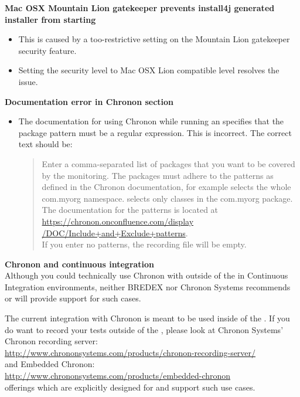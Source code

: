 \textbf{Mac OSX Mountain Lion gatekeeper prevents install4j generated installer from starting}
\begin{itemize}
\item This is caused by a too-restrictive setting on the Mountain Lion gatekeeper security feature.
\item Setting the security level to Mac OSX Lion compatible level resolves the issue.
\end{itemize}


\textbf{Documentation error in Chronon section}
\begin{itemize}
\item The documentation for using Chronon while running an \gdaut{} specifies that the package pattern must be a regular expression. This is incorrect. The correct text should be: 
\begin{quote}Enter a comma-separated list of packages that you want to be covered by the monitoring. The packages must adhere to the patterns as defined in the Chronon documentation, for example  selects the whole com.myorg namespace.  selects only classes in the com.myorg package. The documentation for the patterns is located at \\
\href{https://chronon.onconfluence.com/display/DOC/Include+and+Exclude+patterns}{https://chronon.onconfluence.com/display\\
/DOC/Include+and+Exclude+patterns}.\\
 If you enter no patterns, the recording file will be empty.
\end{quote}
\end{itemize}

\textbf{Chronon and continuous integration}\\

Although you could technically use Chronon with \app{} outside of the \ite{} in Continuous Integration environments, neither BREDEX nor Chronon Systems recommends or will provide support for such cases.

The current integration with Chronon is meant to be used inside of the \ite{}. If you do want to record your tests outside of the \ite{}, please look at Chronon Systems' Chronon recording server:\\
 \href{http://www.chrononsystems.com/products/chronon-recording-server/}{http://www.chrononsystems.com/products/chronon-recording-server/}\\
and Embedded Chronon:\\
\href{http://www.chrononsystems.com/products/embedded-chronon}{http://www.chrononsystems.com/products/embedded-chronon} \\
 offerings which are explicitly designed for and support such use cases.

